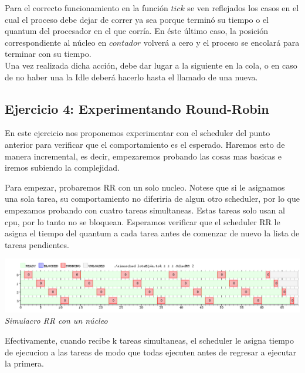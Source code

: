 Para el correcto funcionamiento en la funci\'on $tick$ se ven reflejados los casos en el cual el proceso debe 
dejar de correr ya sea porque termin\'o su tiempo o el quantum del procesador en el que corr\'ia. En \'este \'ultimo 
caso, la posici\'on correspondiente al n\'ucleo en $contador$ volver\'a a cero y el proceso se encolar\'a para terminar con su tiempo. 
\\Una vez realizada dicha acci\'on, debe dar lugar a la siguiente en la cola, o en caso de no haber una la Idle 
deber\'a hacerlo hasta el llamado de una nueva.

\subsection{Ejercicio 4: Experimentando Round-Robin}

En este ejercicio nos proponemos experimentar con el scheduler del punto anterior para verificar que el comportamiento es el esperado. Haremos esto de 
manera incremental, es decir, empezaremos probando las cosas mas basicas e iremos subiendo la complejidad. 

Para empezar, probaremos RR con un solo nucleo. Notese que si le asignamos una sola tarea, su comportamiento no diferiria de algun otro scheduler, por
lo que empezamos probando con cuatro tareas simultaneas. Estas tareas solo usan al cpu, por lo tanto no se bloquean. Esperamos 
verificar que el scheduler RR le asigna el tiempo del quantum a cada tarea antes de comenzar de nuevo la lista de tareas pendientes.

\vspace{\baselineskip}
\begin{center}
\includegraphics[scale=0.45]{../tp1/Test/resEj4Co1SB.png}
\\
\vspace{1pt}
\footnotesize\textit{Simulacro RR con un n\'ucleo}
\end{center}
\vspace{\baselineskip}

Efectivamente, cuando recibe k tareas simultaneas, el scheduler le asigna tiempo de ejecucion a las tareas de modo que todas 
ejecuten antes de regresar a ejecutar la primera. 

